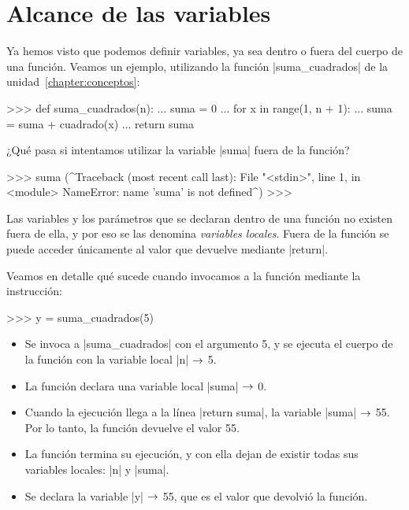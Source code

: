 \section{Alcance de las variables}

Ya hemos visto que podemos definir variables, ya sea dentro o fuera del cuerpo
de una función. Veamos un ejemplo, utilizando la función |suma_cuadrados| de la
unidad~\ref{chapter:conceptos}:

\begin{codigo-python-sn}
>>> def suma_cuadrados(n):
...     suma = 0
...     for x in range(1, n + 1):
...         suma = suma + cuadrado(x)
...     return suma
\end{codigo-python-sn}

¿Qué pasa si intentamos utilizar la variable |suma| fuera de la función?

\begin{codigo-python-sn}
>>> suma
(^Traceback (most recent call last):
  File "<stdin>", line 1, in <module>
NameError: name 'suma' is not defined^)
>>>
\end{codigo-python-sn}

\begin{observacion}
Las variables y los parámetros que se declaran dentro de una función no existen
fuera de ella, y por eso se las denomina \emph{variables locales}. Fuera de la
función se puede acceder únicamente al valor que devuelve mediante |return|.
\end{observacion}

Veamos en detalle qué sucede cuando invocamos a la función mediante la
instrucción:

\begin{codigo-python-sn}
>>> y = suma_cuadrados(5)
\end{codigo-python-sn}

\begin{itemize}
\item Se invoca a |suma_cuadrados| con el argumento 5, y se ejecuta
    el cuerpo de la función con la variable local |n| $\rightarrow$ 5.
\item La función declara una variable local |suma| $\rightarrow$ 0.
\item Cuando la ejecución llega a la línea |return suma|, la variable |suma|
    $\rightarrow$ 55. Por lo tanto, la función devuelve el valor 55.
\item La función termina su ejecución, y con ella dejan de existir todas sus
    variables locales: |n| y |suma|.
\item Se declara la variable |y| $\rightarrow$ 55, que es el valor que devolvió la
    función.
\end{itemize}


